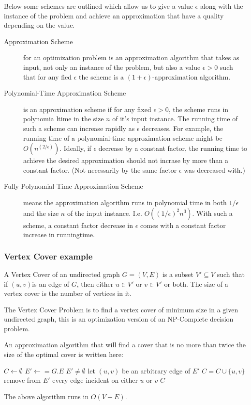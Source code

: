Below some schemes are outlined which allow us to give a value $\epsilon$ along
with the instance of the problem and achieve an approximation that have a
quality depending on the value.
\begin{description}
\item[Approximation Scheme] for an optimization problem is an approximation
  algorithm that takes as input, not only an instance of the problem, but also a
  value $\epsilon > 0$ such that for any fied $\epsilon$ the scheme is a
  $(1+\epsilon)$-approximation algorithm.

\item[Polynomial-Time Approximation Scheme] is an approximation scheme if for
  any fixed $\epsilon > 0$, the scheme runs in polynomia ltime in the size $n$
  of it's input instance. The running time of such a scheme can increase rapidly
  as $\epsilon$ decreases. For example, the running time of a polynomial-time
  approximation scheme might be $O(n^{(2/\epsilon)})$. Ideally, if $\epsilon$
  decrease by a constant factor, the running time to achieve the desired
  approximation should not incrase by more than a constant factor. (Not
  necessarily by the same factor $\epsilon$ was decreased with.)

\item[Fully Polynomial-Time Approximation Scheme] means the approximation
  algorithm runs in polynomial time in both $1/\epsilon$ and the size $n$ of the
  input instance. I.e. $O((1/\epsilon)^2n^3)$. With such a scheme, a constant
  factor decrease in $\epsilon$ comes with a constant factor increase in
  runningtime.
\end{description}


\subsubsection{Vertex Cover example}

A Vertex Cover of an undirected graph $G = (V,E)$ is a subset $V' \subseteq V$
such that if $(u,v)$is an edge of $G$, then either $u \in V'$ or $v \in V'$ or
both. The size of a vertex cover is the number of vertices in it.

The Vertex Cover Problem is to find a vertex cover of minimum size in a given
undirected graph, this is an optimization version of an NP-Complete decision
problem.

An approximation algorithm that will find a cover that is no more than twice the
size of the optimal cover is written here:
\begin{codebox}
\li $C \gets \emptyset$
\li $E' \gets = G.E$
\li \While $E' \neq \emptyset$ \Do
\li   let $(u,v)$ be an arbitrary edge of $E'$
\li   $C = C \cup \{u,v\}$
\li   remove from $E'$ every edge incident on either $u$ or $v$ \End
\li \Return $C$
\end{codebox}
The above algorithm runs in $O(V+E)$.

